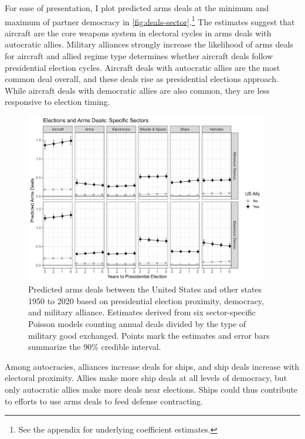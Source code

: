 \documentclass[12pt]{article}
\begin{document}
For ease of presentation, I plot predicted arms deals at the minimum and maximum of partner democracy in \autoref{fig:deals-sector}.\footnote{See the appendix for underlying coefficient estimates.}
The estimates suggest that aircraft are the core weapons system in electoral cycles in arms deals with autocratic allies. 
Military alliances strongly increase the likelihood of arms deals for aircraft and allied regime type determines whether aircraft deals follow presidential election cycles. 
Aircraft deals with autocratic allies are the most common deal overall, and these deals rise as presidential elections approach. 
While aircraft deals with democratic allies are also common, they are less responsive to election timing. 



\begin{figure}[htpb]
	\centering
		\includegraphics[width=0.95\textwidth]{../figures/deals-sector.png}
	\caption{Predicted arms deals between the United States and other states 1950 to 2020 based on presidential election proximity, democracy, and military alliance. Estimates derived from six sector-specific Poisson models counting annual deals divided by the type of military good exchanged. Points mark the estimates and error bars summarize the 90\% credible interval.}
	\label{fig:deals-sector}
\end{figure}


Among autocracies, alliances increase deals for ships, and ship deals increase with electoral proximity. 
Allies make more ship deals at all levels of democracy, but only autocratic allies make more deals near elections. 
Ships could thus contribute to efforts to use arms deals to feed defense contracting. 
\end{document}
